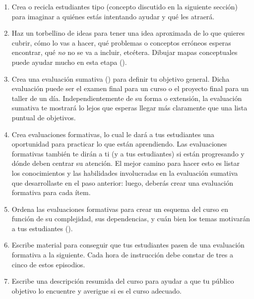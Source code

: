 \begin{enumerate}
 
\item
Crea o recicla estudiantes tipo (concepto discutido en la siguiente sección)
para imaginar a quiénes estás intentando ayudar y qué les atraerá.

 \item
Haz un torbellino de ideas para tener una idea aproximada de lo que quieres cubrir,
cómo lo vas a hacer,
qué problemas o conceptos erróneos esperas encontrar,
qué \emph{no} no se va a incluir, etcétera.
Dibujar mapas conceptuales puede ayudar mucho en esta etapa ().
 
\item
Crea una evaluación sumativa ()
para definir tu objetivo general.
Dicha evaluación puede ser el examen final para un curso
o el proyecto final para un taller de un día.
Independientemente de su forma o extensión,
la evaluación sumativa te mostrará lo lejos que esperas llegar
más claramente que una lista puntual de objetivos.
 
\item
Crea evaluaciones formativas,
lo cual le dará a tus estudiantes una oportunidad para practicar lo que están aprendiendo.
Las evaluaciones formativas también te dirán a ti (y a tus estudiantes) si están progresando
y dónde deben centrar su atención.
El mejor camino para hacer esto es listar los conocimientos y las habilidades
involucradas en la evaluación sumativa que desarrollaste en el paso anterior: luego, deberás crear una evaluación formativa para cada ítem.
 
\item
Ordena las evaluaciones formativas para crear un esquema del curso
en función de su complejidad,
sus dependencias,
y cuán bien los temas motivarán a tus estudiantes ().
 
\item
Escribe material para conseguir que tus estudiantes pasen de una evaluación formativa a la siguiente.
Cada hora de instrucción debe constar de tres a cinco de estos episodios.
 
\item
Escribe una descripción resumida del curso
para ayudar a que tu público objetivo lo encuentre
y averigue si es el curso adecuado.
 \end{enumerate}
 

